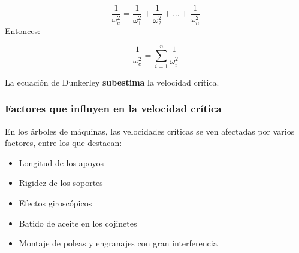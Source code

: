 \documentclass[spanish,11pt,a4paper]{article}
\begin{document}
	\begin{equation*} 
		\dfrac{1}{\omega_c^2} = \dfrac{1}{\omega_1^2} + \dfrac{1}{\omega_2^2} + \dots + \dfrac{1}{\omega_n^2}
	\end{equation*}
	Entonces:
	\begin{tcolorbox}
		$$\dfrac{1}{\omega_c^2} = \sum_{i=1}^n \dfrac{1}{\omega_{i}^2}
		$$
	\end{tcolorbox}
	
	La ecuación de Dunkerley \textbf{subestima} la velocidad crítica.
	
	\subsubsection{Factores que influyen en la velocidad crítica}
	En los árboles de máquinas, las velocidades críticas se ven afectadas por varios factores, entre los que destacan:
	\begin{itemize}
		\item Longitud de los apoyos
		\item Rigidez de los soportes
		\item Efectos giroscópicos
		\item Batido de aceite en los cojinetes
		\item Montaje de poleas y engranajes con gran interferencia
	\end{itemize}
\end{document}
